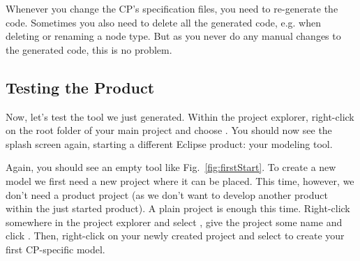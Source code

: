 \documentclass[a4paper,american,12pt]{scrreprt}
\begin{document}
Whenever you change the CP's specification files, you need to re-generate the
code. Sometimes you also need to delete all the generated code, e.g. when
deleting or renaming a node type. But as you never do any manual changes to the
generated code, this is no problem. 

\subsection{Testing the \cinco Product} \label{sec:testing}

Now, let's test the tool we just generated. Within the project explorer,
right-click on the root folder of your main project and choose . You should now see the \cinco splash screen again,
starting a different Eclipse product: your modeling tool. \footnotemark


Again, you should see an empty tool like Fig.~\ref{fig:firstStart}. To create a
new model we first need a new project where it can be placed. This time,
however, we don't need a \cinco product project (as we don't want to develop
another \cinco product within the just started \cinco product). A plain project
is enough this time. Right-click somewhere in the project explorer and select
, give the project some name
and click . Then, right-click on your newly created project and
select  to create your
first CP-specific model.
\end{document}
